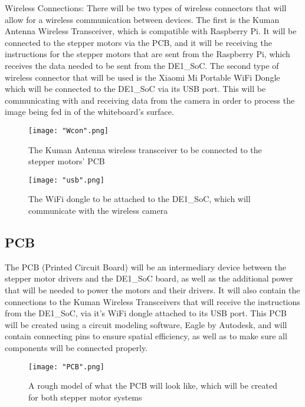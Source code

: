 Wireless Connections: There will be two types of wireless connectors that will allow for a wireless communication between devices. The first is the Kuman Antenna Wireless Transceiver, which is compatible with Raspberry Pi. It will be connected to the stepper motors via the PCB, and it will be receiving the instructions for the stepper motors that are sent from the Raspberry Pi, which receives the data needed to be sent from the DE1\_SoC. The second type of wireless connector that will be used is the Xiaomi Mi Portable WiFi Dongle which will be connected to the DE1\_SoC via its USB port. This will be communicating with and receiving data from the camera in order to process the image being fed in of the whiteboard’s surface.


\begin{figure}[H]
	\centering
	{\texttt{[image: "Wcon".png]}}
	\caption{ The Kuman Antenna wireless transceiver to be connected to the stepper motors’ PCB
		\cite{smdataR}}
	\label{fig:Wcon}
\end{figure}

\begin{figure}[H]
	\centering
	{\texttt{[image: "usb".png]}}
	\caption{ The WiFi dongle to be attached to the DE1\_SoC, which will communicate with the wireless camera
		\cite{smdataR}}
	\label{fig:usb}
\end{figure}

\subsection{PCB}

The PCB (Printed Circuit Board) will be an intermediary device between the stepper motor drivers and the DE1\_SoC board, as well as the additional power that will be needed to power the motors and their drivers. It will also contain the connections to the Kuman Wireless Transceivers that will receive the instructions from the DE1\_SoC, via it’s WiFi dongle attached to its USB port. This PCB will be created using a circuit modeling software, Eagle by Autodesk, and will contain connecting pins to ensure spatial efficiency, as well as to make sure all components will be connected properly.

\begin{figure}[H]
	\centering
	{\texttt{[image: "PCB".png]}}
	\caption{ A rough model of what the PCB will look like, which will be created for both stepper motor systems
		\cite{smdataR}}
	\label{fig:PCB}
\end{figure}

